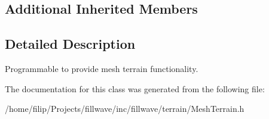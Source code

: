 \subsection*{Additional Inherited Members}


\subsection{Detailed Description}
Programmable to provide mesh terrain functionality. 

The documentation for this class was generated from the following file\+:\begin{DoxyCompactItemize}
\item 
/home/filip/\+Projects/fillwave/inc/fillwave/terrain/Mesh\+Terrain.\+h\end{DoxyCompactItemize}
